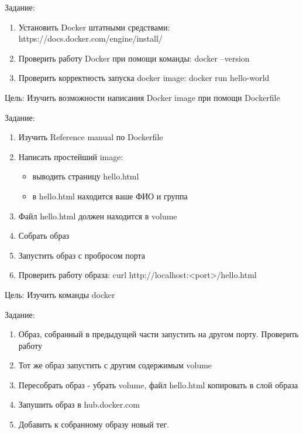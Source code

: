 Задание:
\begin{enumerate}
    \item Установить Docker штатными средствами: https://docs.docker.com/engine/install/
    \item Проверить работу Docker при помощи команды: docker –version
    \item Проверить корректность запуска docker image: docker run hello-world
\end{enumerate}


Цель: Изучить возможности написания Docker image при помощи Dockerfile

Задание:
\begin{enumerate}
    \item Изучить Reference manual по Dockerfile
    \item Написать простейший image: 
    \begin{itemize}
        \item выводить страницу hello.html
        \item в hello.html находится ваше ФИО и группа
    \end{itemize}
    \item Файл hello.html должен находится в volume
    \item Собрать образ
    \item Запустить образ с пробросом порта
    \item Проверить работу образа: curl http://localhost:<port>/hello.html 
\end{enumerate}


Цель: Изучить команды docker

Задание:
\begin{enumerate}
    \item Образ, собранный в предыдущей части запустить на другом порту. Проверить работу
    \item Тот же образ запустить с другим содержимым volume
    \item Пересобрать образ - убрать volume, файл hello.html копировать в слой образа
    \item Запушить образ в hub.docker.com
    \item Добавить к собранному образу новый тег.
\end{enumerate}


